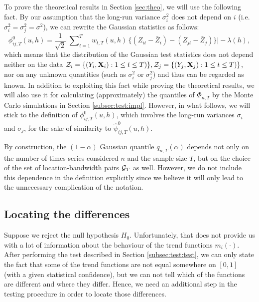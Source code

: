 \documentclass[a4paper,12pt]{article}
\makeatletter
\renewcommand{\eqref}[1]{\tagform@{\ref{#1}}}
\makeatother
\begin{document}
\begin{remark}
To prove the theoretical results in Section \ref{sec:theo}, we will use the following fact. By our assumption that the long-run variance $\sigma_i^2$ does not depend on $i$ \linebreak (i.e. $\sigma_i^2 = \sigma^2_j = \sigma^2$), we can rewrite the Gaussian statistics \eqref{eq:test:phi_zero_ij} as follows:
\[\phi^0_{ij,T}(u, h) = \frac{1}{\sqrt{2}} \Big|\sum\nolimits_{t=1}^T w_{t,T}(u,h) \, \big\{ (Z_{it} - \bar{Z}_i) - (Z_{jt} - \bar{Z}_j) \big\}\Big| - \lambda(h), \] 
which means that the distribution of the Gaussian test statistics does not depend neither on the data $\mathcal{Z}_i =\{ (Y_i, \mathbf{X}_i) : 1\leq t \leq T)\}, \mathcal{Z}_j =\{ (Y_j, \mathbf{X}_j) : 1\leq t \leq T)\}$, nor on any unknown quantities (such as $\sigma^2_i$ or $\sigma_j^2$) and thus can be regarded as known. In addition to exploiting this fact while proving the theoretical results, we will also use it for calculating (approximately) the quantiles of $\Phi_{n, T}$ by the Monte Carlo simulations in Section \ref{subsec:test:impl}. However, in what follows, we will stick to the definition \eqref{eq:test:phi_zero_ij} of $\phi^0_{ij,T}(u, h)$, which involves the long-run variances $\sigma_i$ and $\sigma_j$, for the sake of similarity to $\hat{\psi}^0_{ij,T}(u, h)$.
\end{remark}

\begin{remark}
By construction, the $(1-\alpha)$ Gaussian quantile $q_{n, T}(\alpha)$ depends not only on the number of times series considered $n$ and the sample size $T$, but on the choice of the set of location-bandwidth pairs $\mathcal{G}_T$ as well. However, we do not include this dependence in the definition explicitly since we believe it will only lead to the unnecessary complication of the notation. 
\end{remark}

\subsection{Locating the differences}\label{subsec:test:loc}

Suppose we reject the null hypothesis $H_0$. Unfortunately, that does not provide us with a lot of information about the behaviour of the trend functions $m_i(\cdot)$. After performing the test described in Section \ref{subsec:test:test}, we can only state the fact that some of the trend functions are not equal somewhere on $[0, 1]$ (with a given statistical confidence), but we can not tell which of the functions are different and where they differ. Hence, we need an additional step in the testing procedure in order to locate those differences.
\end{document}
